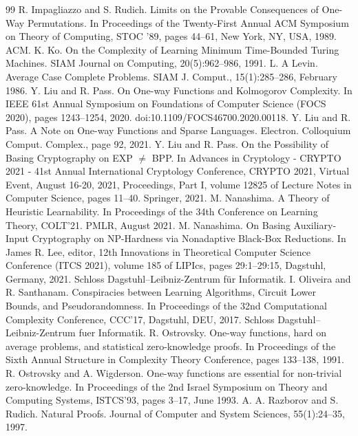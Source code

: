 \documentclass[10pt,a4paper]{article}
\begin{document}
\begin{thebibliography}{99}
 R. Impagliazzo and S. Rudich. Limits on the Provable Consequences of One-Way Permutations. In Proceedings of the Twenty-First Annual ACM Symposium on Theory of Computing, STOC ’89, pages 44–61, New York, NY, USA, 1989. ACM.
 K. Ko. On the Complexity of Learning Minimum Time-Bounded Turing Machines. SIAM Journal on Computing, 20(5):962–986, 1991.
 L. A Levin. Average Case Complete Problems. SIAM J. Comput., 15(1):285–286, February 1986.
 Y. Liu and R. Pass. On One-way Functions and Kolmogorov Complexity. In IEEE 61st Annual Symposium on Foundations of Computer Science (FOCS 2020), pages 1243–1254, 2020. doi:10.1109/FOCS46700.2020.00118.
 Y. Liu and R. Pass. A Note on One-way Functions and Sparse Languages. Electron. Colloquium Comput. Complex., page 92, 2021.
 Y. Liu and R. Pass. On the Possibility of Basing Cryptography on EXP $\neq$ BPP. In Advances in Cryptology - CRYPTO 2021 - 41st Annual International Cryptology Conference, CRYPTO 2021, Virtual Event, August 16-20, 2021, Proceedings, Part I, volume 12825 of Lecture Notes in Computer Science, pages 11–40. Springer, 2021.
 M. Nanashima. A Theory of Heuristic Learnability. In Proceedings of the 34th Conference on Learning Theory, COLT’21. PMLR, August 2021.
 M. Nanashima. On Basing Auxiliary-Input Cryptography on NP-Hardness via Nonadaptive Black-Box Reductions. In James R. Lee, editor, 12th Innovations in Theoretical Computer Science Conference (ITCS 2021), volume 185 of LIPIcs, pages 29:1–29:15, Dagstuhl, Germany, 2021. Schloss Dagstuhl–Leibniz-Zentrum für Informatik.
 I. Oliveira and R. Santhanam. Conspiracies between Learning Algorithms, Circuit Lower Bounds, and Pseudorandomness. In Proceedings of the 32nd Computational Complexity Conference, CCC’17, Dagstuhl, DEU, 2017. Schloss Dagstuhl–Leibniz-Zentrum fuer Informatik.
 R. Ostrovsky. One-way functions, hard on average problems, and statistical zero-knowledge proofs. In Proceedings of the Sixth Annual Structure in Complexity Theory Conference, pages 133–138, 1991.
 R. Ostrovsky and A. Wigderson. One-way functions are essential for non-trivial zero-knowledge. In Proceedings of the 2nd Israel Symposium on Theory and Computing Systems, ISTCS’93, pages 3–17, June 1993.
 A. A. Razborov and S. Rudich. Natural Proofs. Journal of Computer and System Sciences, 55(1):24–35, 1997.

\end{thebibliography}
\end{document}
